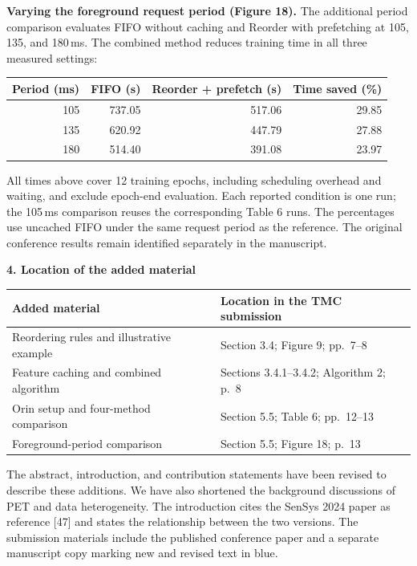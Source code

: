 \documentclass[11pt,letterpaper]{article}
\begin{document}
\textbf{Varying the foreground request period (Figure 18).}
The additional period comparison evaluates FIFO without caching and Reorder with prefetching at 105, 135, and 180\,ms. The combined method reduces training time in all three measured settings:

\begin{center}
\begin{tabular}{@{}rrrr@{}}
\toprule
Period (ms) & FIFO (s) & Reorder + prefetch (s) & Time saved (\%) \\
\midrule
105 & 737.05 & 517.06 & 29.85 \\
135 & 620.92 & 447.79 & 27.88 \\
180 & 514.40 & 391.08 & 23.97 \\
\bottomrule
\end{tabular}
\end{center}

All times above cover 12 training epochs, including scheduling overhead and waiting, and exclude epoch-end evaluation. Each reported condition is one run; the 105\,ms comparison reuses the corresponding Table 6 runs. The percentages use uncached FIFO under the same request period as the reference. The original conference results remain identified separately in the manuscript.

\textbf{4. Location of the added material}

\begin{center}
\begin{tabularx}{\linewidth}{@{}Xl@{}}
\toprule
Added material & Location in the TMC submission \\
\midrule
Reordering rules and illustrative example & Section 3.4; Figure 9; pp.\ 7--8 \\
Feature caching and combined algorithm & Sections 3.4.1--3.4.2; Algorithm 2; p.\ 8 \\
Orin setup and four-method comparison & Section 5.5; Table 6; pp.\ 12--13 \\
Foreground-period comparison & Section 5.5; Figure 18; p.\ 13 \\
\bottomrule
\end{tabularx}
\end{center}

The abstract, introduction, and contribution statements have been revised to describe these additions. We have also shortened the background discussions of PET and data heterogeneity. The introduction cites the SenSys 2024 paper as reference [47] and states the relationship between the two versions. The submission materials include the published conference paper and a separate manuscript copy marking new and revised text in blue.
\end{document}
